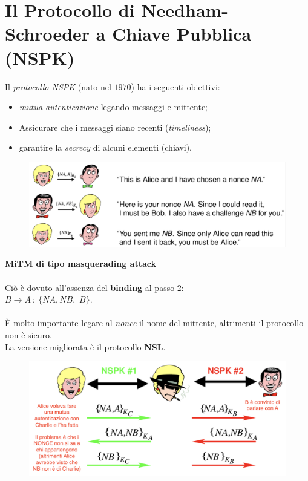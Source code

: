 \documentclass[11pt, a4paper, twoside, italian]{report}
\theoremstyle{plain}
\begin{document}
\newpage
\section*{Il Protocollo di Needham-Schroeder a Chiave Pubblica (NSPK)}
Il \textit{protocollo NSPK} (nato nel $1970$) ha i seguenti obiettivi:
\begin{multicols}{2}
	\begin{itemize}
		\item \textit{mutua autenticazione} legando messaggi e mittente;
		\item Assicurare che i messaggi siano recenti (\textit{timeliness});
		\item garantire la \textit{secrecy} di alcuni elementi (chiavi).
	\end{itemize}
\columnbreak
	\begin{figure}[H]
		\centering
		\includegraphics[scale=0.45]{NSPK}
	\end{figure}
\end{multicols}

\begin{multicols}{2}
	\noindent
	\textbf{MiTM di tipo masquerading attack}
	\\\\
	Ciò è dovuto all'assenza del \textbf{binding} al passo $2$:\\
	$B \longrightarrow A\ :\ \{ NA, NB,$ \textbf{$B$}$\}$.\\\\
	È molto importante legare al \textit{nonce} il nome del mittente, altrimenti il protocollo non è sicuro.\\
	La versione migliorata è il protocollo \textbf{NSL}.
\columnbreak
	\begin{figure}[H]
		\centering
		\includegraphics[scale=0.46]{mitmnspk}
	\end{figure}
\end{multicols}
\end{document}

